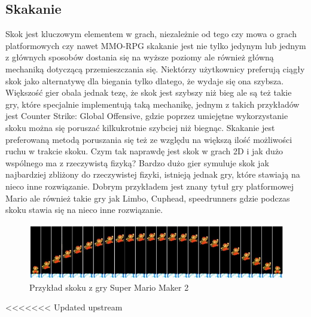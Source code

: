 \documentclass[oneside,polski,logo]{amuthesis}
\begin{document}
\subsection{Skakanie} 
Skok jest kluczowym elementem w grach, niezależnie od tego czy mowa o grach platformowych czy nawet MMO-RPG skakanie jest nie tylko jedynym lub jednym z głównych sposobów dostania się na wyższe poziomy ale również główną mechaniką dotyczącą przemieszczania się. Niektórzy użytkownicy preferują ciągły skok jako alternatywę dla biegania tylko dlatego, że wydaje się ona szybsza. Większość gier obala jednak tezę, że skok jest szybszy niż bieg ale są też takie gry, które specjalnie implementują taką mechanikę, jednym z takich przykładów jest Counter Strike: Global Offensive, gdzie poprzez umiejętne wykorzystanie skoku można się poruszać kilkukrotnie szybciej niż biegnąc. Skakanie jest preferowaną metodą poruszania się też ze względu na większą ilość możliwości ruchu w trakcie skoku.
Czym tak naprawdę jest skok w grach 2D i jak dużo wspólnego ma z rzeczywistą fizyką? Bardzo dużo gier symuluje skok jak najbardziej zbliżony do rzeczywistej fizyki, istnieją jednak gry, które stawiają na nieco inne rozwiązanie. Dobrym przykładem jest znany tytuł gry platformowej Mario ale również takie gry jak Limbo, Cuphead, speedrunners gdzie podczas skoku stawia się na nieco inne rozwiązanie. \cite{jumping1} 
\begin{figure}[h]
	\centering
	\includegraphics[width=13cm]{images/kozubal/mario.jpg}
	\caption{Przykład skoku z gry Super Mario Maker 2 \cite{jumping3}}
\end{figure}
<<<<<<< Updated upstream
\end{document}
